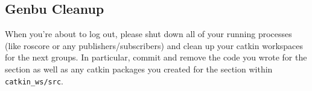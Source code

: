 \subsection{Genbu Cleanup}

When you're about to log out, please shut down all of your running processes (like roscore or any publishers/subscribers) and clean up your catkin workspaces for the next groups. In particular, commit and remove the code you wrote for the section as well as any catkin packages you created for the section within \texttt{catkin\_ws/src}. 
